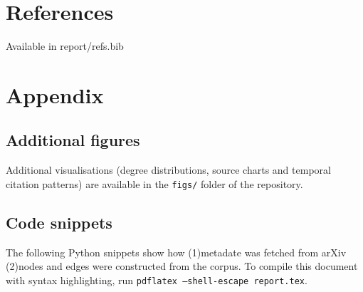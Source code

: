 \section{References}
Available in report/refs.bib


\section{Appendix}

\subsection{Additional figures}
Additional visualisations (degree distributions, source charts and temporal citation patterns) are available in the \texttt{figs/} folder of the repository.

\subsection{Code snippets}
The following Python snippets show how (1)metadate was fetched from arXiv (2)nodes and edges were constructed from the corpus. To compile this document with syntax highlighting, run \texttt{pdflatex --shell-escape report.tex}.


